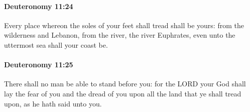 		\paragraph{Deuteronomy 11:24} %
			\label{DEUTERONOMY-11-24}

			Every place whereon the soles of your feet shall tread shall be yours: from the wilderness and Lebanon, from the river, the river Euphrates, even unto the uttermost sea shall your coast be.


		\paragraph{Deuteronomy 11:25} %
			\label{DEUTERONOMY-11-25}

			There shall no man be able to stand before you: for the LORD your God shall lay the fear of you and the dread of you upon all the land that ye shall tread upon, as he hath said unto you.

